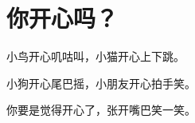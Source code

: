 \documentclass[12pt,UTF-8,openany]{ctexbook}
\begin{document}
\clearpage

\begin{center}
    
    
\end{center}


\hanzibox{}\hanzibox{}\hanzibox{}\hanzibox{}\hspace{1em}\hanzibox{}\hanzibox{}\hanzibox{}\hanzibox{}

\hanzibox{}\hanzibox{}\hanzibox{}\hanzibox{}\hspace{1em}\hanzibox{}\hanzibox{}\hanzibox{}\hanzibox{}

\hanzibox{}\hanzibox{}\hanzibox{}\hanzibox{}\hspace{1em}\hanzibox{}\hanzibox{}\hanzibox{}\hanzibox{}

\hanzibox{}\hanzibox{}\hanzibox{}\hanzibox{}\hspace{1em}




\chapter{你开心吗？}

\begin{large}
    
    小鸟开心叽咕叫，小猫开心上下跳。
    
    小狗开心尾巴摇，小朋友开心拍手笑。
    
    你要是觉得开心了，张开嘴巴笑一笑。
    
\end{large}


\clearpage

\begin{center}
    
\end{center}


\hanzibox{}\hanzibox{}\hanzibox{}\hanzibox{}\hspace{1em}\hanzibox{}\hanzibox{}\hanzibox{}\hanzibox{}

\hanzibox{}\hanzibox{}\hanzibox{}\hanzibox{}\hspace{1em}\hanzibox{}\hanzibox{}\hanzibox{}\hanzibox{}
\end{document}
